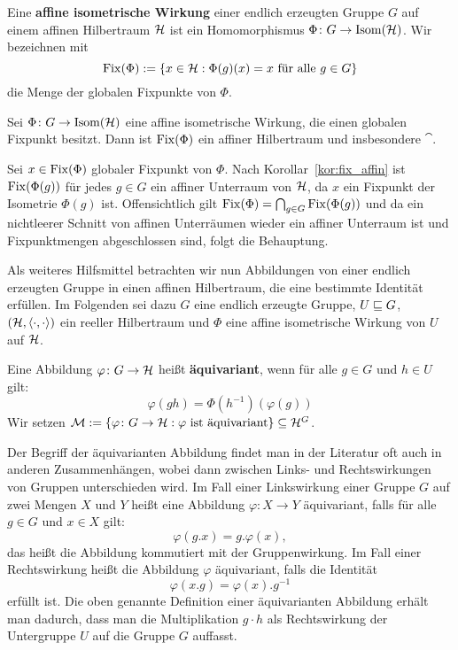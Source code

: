 \begin{definition}
	Eine \textbf{affine isometrische Wirkung} einer endlich erzeugten Gruppe $G$ auf einem affinen Hilbertraum $\mathcal{H}$ ist ein Homomorphismus $\Phi\colon G \rightarrow \operatorname{Isom}(\mathcal{H})$. Wir bezeichnen mit
	\[
		\operatorname{Fix}(\Phi) := \{x \in \mathcal{H} : \Phi(g)(x) = x \text{ für alle } g \in G\}
	\]
	die Menge der globalen Fixpunkte von $\Phi$.
\end{definition}

\begin{proposition}
\label{prop_Fix_HR}
	Sei $\Phi\colon G \rightarrow \operatorname{Isom}(\mathcal{H})$ eine affine isometrische Wirkung, die einen globalen Fixpunkt besitzt. Dann ist $\operatorname{Fix}(\Phi)$ ein affiner Hilbertraum und insbesondere $\cat$.
\end{proposition}

\begin{beweis}
	Sei $x \in \operatorname{Fix}(\Phi)$ globaler Fixpunkt von $\Phi$. Nach Korollar~\ref{kor:fix_affin} ist $\operatorname{Fix}(\Phi(g))$ für jedes $g \in G$ ein affiner Unterraum von $\mathcal{H}$, da $x$ ein Fixpunkt der Isometrie $\Phi(g)$ ist. Offensichtlich gilt $\operatorname{Fix}(\Phi) = \bigcap_{g \in G} \operatorname{Fix}(\Phi(g))$ und da ein nichtleerer Schnitt von affinen Unterräumen wieder ein affiner Unterraum ist und Fixpunktmengen abgeschlossen sind, folgt die Behauptung.
\end{beweis}
\newpage
Als weiteres Hilfsmittel betrachten wir nun Abbildungen von einer endlich erzeugten Gruppe in einen affinen Hilbertraum, die eine bestimmte Identität erfüllen. Im Folgenden sei dazu $G$ eine endlich erzeugte Gruppe, $U \sqsubseteq G$, $(\mathcal{H},\langle\cdot,\cdot\rangle)$ ein reeller Hilbertraum und $\Phi$ eine affine isometrische Wirkung von $U$ auf $\mathcal{H}$.

\begin{definition}
	Eine Abbildung $\varphi \colon G \rightarrow \mathcal{H}$ heißt \textbf{äquivariant}, wenn für alle $g \in G$ und $h \in U$ gilt:
	\begin{equation}
		\varphi(gh) = \Phi(h^{-1})(\varphi(g))
	\end{equation}
	Wir setzen $\mathcal{M} := \{ \varphi \colon G \rightarrow \mathcal{H} : \varphi \text{ ist äquivariant}\} \subseteq \mathcal{H}^G$.
\end{definition}

\begin{bemerkung}
	Der Begriff der äquivarianten Abbildung findet man in der Literatur oft auch in anderen Zusammenhängen, wobei dann zwischen Links- und Rechtswirkungen von Gruppen unterschieden wird. Im Fall einer Linkswirkung einer Gruppe $G$ auf zwei Mengen $X$ und $Y$ heißt eine Abbildung $\varphi\colon X \rightarrow Y$ äquivariant, falls für alle $g \in G$ und $x \in X$ gilt:
		\[ \varphi(g.x) = g.\varphi(x), \]
	das heißt die Abbildung kommutiert mit der Gruppenwirkung. Im Fall einer Rechtswirkung heißt die Abbildung $\varphi$ äquivariant, falls die Identität
		\[ \varphi(x.g) = \varphi(x).g^{-1} \]
	erfüllt ist. Die oben genannte Definition einer äquivarianten Abbildung erhält man dadurch, dass man die Multiplikation $g \cdot h$ als Rechtswirkung der Untergruppe $U$ auf die Gruppe $G$ auffasst.	
\end{bemerkung}

